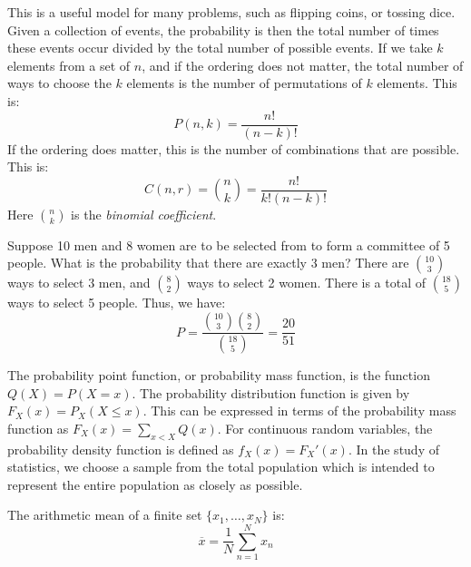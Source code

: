 \documentclass[crop=false,class=book,oneside]{standalone}
\begin{document}
        This is a useful model for many problems, such as flipping
        coins, or tossing dice. Given a collection of events, the probability
        is then the total number of times these events occur divided by
        the total number of possible events. If we take $k$ elements from
        a set of $n$, and if the ordering does not matter, the total number of
        ways to choose the $k$ elements is the number of permutations of $k$
        elements. This is:
        \begin{equation*}
            P(n,k)=\frac{n!}{(n-k)!}
        \end{equation*}
        If the ordering does matter, this is the number of combinations
        that are possible. This is:
        \begin{equation*}
            C(n,r)=\binom{n}{k}=\frac{n!}{k!(n-k)!}
        \end{equation*}
        Here $\binom{n}{k}$ is the \textit{binomial coefficient}.
        \begin{example}
            Suppose 10 men and 8 women are to be selected from to form
            a committee of 5 people. What is the probability that there
            are exactly 3 men? There are $\binom{10}{3}$ ways to
            select 3 men, and $\binom{8}{2}$ ways to select 2 women.
            There is a total of $\binom{18}{5}$ ways to select 5 people.
            Thus, we have:
            \begin{equation*}
                P=\frac{\binom{10}{3}\binom{8}{2}}{\binom{18}{5}}
                =\frac{20}{51}
            \end{equation*}
        \end{example}
        The probability point function, or probability mass function,
        is the function $Q(X)=P(X=x)$. The probability distribution
        function is given by
        $F_{X}(x)=P_{X}(X\leq{x})$. This can be expressed in
        terms of the probability mass function as
        $F_{X}(x)=\sum_{x<X}Q(x)$. For continuous random variables,
        the probability density function is defined as
        $f_{X}(x)=F_{X}'(x)$. In the study of statistics, we choose a sample
        from the total population which is intended to represent the
        entire population as closely as possible.
        \begin{definition}
            The arithmetic mean of a finite set
            $\{x_{1},\hdots,x_{N}\}$ is:
            \begin{equation*}
                \overline{x}=\frac{1}{N}\sum_{n=1}^{N}x_{n}
            \end{equation*}
        \end{definition}
\end{document}
